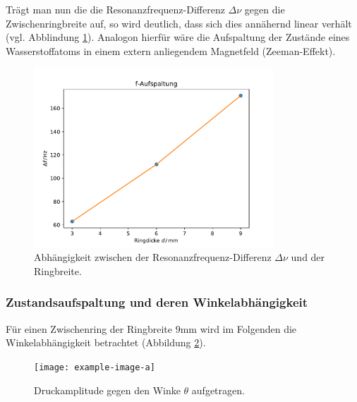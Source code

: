 Trägt man nun die die Resonanzfrequenz-Differenz $\Delta\nu$ gegen die Zwischenringbreite auf,
so wird deutlich, dass sich dies annähernd linear verhält (vgl. Abblindung \ref{fig:d_res}). Analogon hierfür wäre die Aufspaltung der Zustände eines
Wasserstoffatoms in einem extern anliegendem Magnetfeld (Zeeman-Effekt).

\begin{figure}[H]
    \center
    \includegraphics[width=0.8\textwidth]{plots/Hatom/faufspaltung.pdf}
    \caption{Abhängigkeit zwischen der Resonanzfrequenz-Differenz $\Delta\nu$ und der Ringbreite.}
    \label{fig:d_res}
\end{figure}

\subsubsection*{Zustandsaufspaltung und deren Winkelabhängigkeit}
Für einen Zwischenring der Ringbreite $9$mm wird im Folgenden die Winkelabhängigkeit betrachtet (Abbildung \ref{fig:9mm_winkel}).

\begin{figure}[H]
    \center
    \texttt{[image: example-image-a]}
    \caption{Druckamplitude gegen den Winke $\theta$ aufgetragen.}
    \label{fig:9mm_winkel}
\end{figure}

